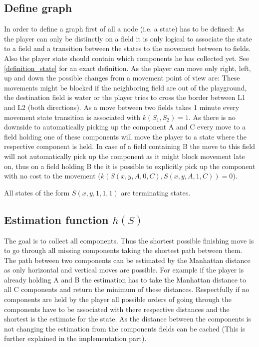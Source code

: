 \documentclass{article}
\begin{document}
\subsection{Define graph}
In order to define a graph first of all a node (i.e. a state) has to be defined: As the player can only be distinctly on a field it is only logical to associate the state to a field and a transition between the states to the movement between to fields. Also the player state should contain which components he has collected yet. See \ref{definition_state} for an exact definition. As the player can move only right, left, up and down the possible changes from a movement point of view are:
These movements might be blocked if the neighboring field are out of the playground, the destination field is water or the player tries to cross the border between L1 and L2 (both directions).
As a move between two fields takes 1 minute every movement state transition is associated with $k(S_1, S_2) = 1$.
As there is no downside to automatically picking up the component A and C every move to a field holding one of these components will move the player to a state where the respective component is held. In case of a field containing B the move to this field will not automatically pick up the component as it might block movement late on, thus on a field holding B the it is possible to explicitly pick up the component with no cost to the movement ($k(S(x,y,A,0,C), S(x,y,A,1,C)) = 0$).

All states of the form $S(x,y,1,1,1)$ are terminating states.

\subsection{Estimation function $h(S)$}
The goal is to collect all components. Thus the shortest possible finishing move is to go through all missing components taking the shortest path between them. The path between two components can be estimated by the Manhattan distance as only horizontal and vertical moves are possible. For example if the player is already holding A and B the estimation has to take the Manhattan distance to all C components and return the minimum of these distances. Respectfully if no components are held by the player all possible orders of going through the components have to be associated with there respective distances and the shortest is the estimate for the state. As the distance between the components is not changing the estimation from the components fields can be cached (This is further explained in the implementation part). %
\end{document}
